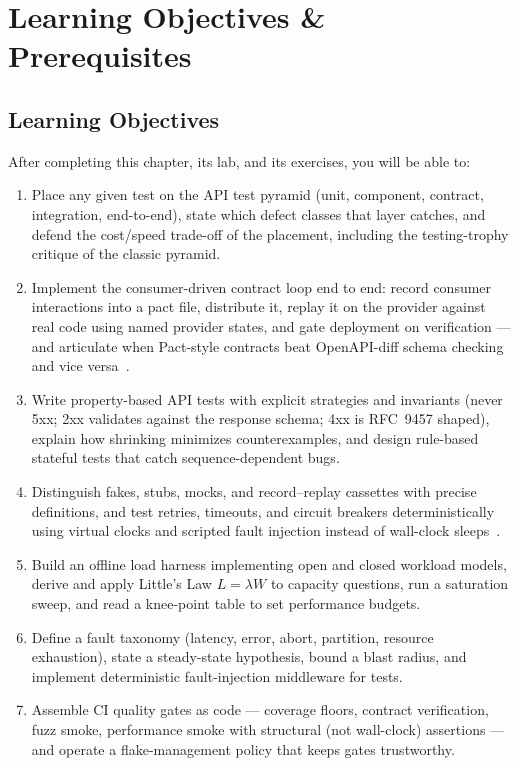 \section{Learning Objectives \& Prerequisites}
\label{sec:ch19-objectives}

\subsection*{Learning Objectives}
After completing this chapter, its lab, and its exercises, you will be able to:

\begin{enumerate}[label=\textbf{LO-\arabic*.}, leftmargin=2.6cm]
  \item Place any given test on the API test pyramid (unit, component,
        contract, integration, end-to-end), state which defect classes that
        layer catches, and defend the cost/speed trade-off of the placement,
        including the testing-trophy critique of the classic pyramid.
  \item Implement the consumer-driven contract loop end to end: record
        consumer interactions into a pact file, distribute it, replay it on
        the provider against real code using named provider states, and
        gate deployment on verification --- and articulate when Pact-style
        contracts beat OpenAPI-diff schema checking and vice
        versa~\cite{pactdocs,openapi31}.
  \item Write property-based API tests with explicit strategies and
        invariants (never 5xx; 2xx validates against the response schema;
        4xx is RFC~9457 shaped), explain how shrinking minimizes
        counterexamples, and design rule-based stateful tests that catch
        sequence-dependent bugs.
  \item Distinguish fakes, stubs, mocks, and record--replay cassettes with
        precise definitions, and test retries, timeouts, and circuit
        breakers deterministically using virtual clocks and scripted fault
        injection instead of wall-clock sleeps~\cite{httpxdocs}.
  \item Build an offline load harness implementing open and closed workload
        models, derive and apply Little's Law $L = \lambda W$ to capacity
        questions, run a saturation sweep, and read a knee-point table to
        set performance budgets.
  \item Define a fault taxonomy (latency, error, abort, partition, resource
        exhaustion), state a steady-state hypothesis, bound a blast radius,
        and implement deterministic fault-injection middleware for tests.
  \item Assemble CI quality gates as code --- coverage floors, contract
        verification, fuzz smoke, performance smoke with structural (not
        wall-clock) assertions --- and operate a flake-management policy
        that keeps gates trustworthy.
\end{enumerate}

